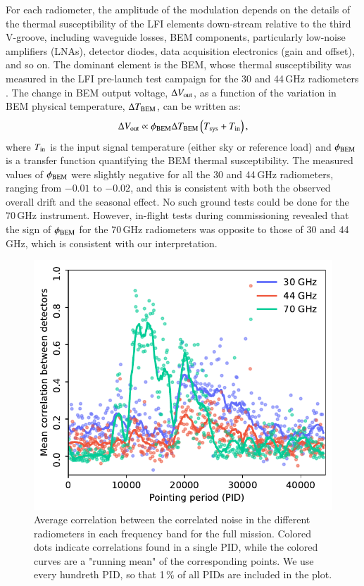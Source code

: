 \documentclass{aa}
\begin{document}
For each radiometer, the amplitude of the modulation depends on the
details of the thermal susceptibility of the LFI elements down-stream
relative to the third V-groove, including waveguide losses, BEM
components, particularly low-noise amplifiers (LNAs), detector diodes,
data acquisition electronics (gain and offset), and so on.
The dominant element is the BEM, whose
thermal susceptibility was measured in the LFI pre-launch test
campaign for the 30 and 44\,GHz radiometers \citep{villa2010}. The
change in BEM output voltage, $\Delta V_{\rm out}$, as a function of
the variation in BEM physical temperature, $\Delta T_{\rm BEM}$, can
be written as:
\begin{equation}
\Delta V_{\rm out} \propto \phi_{\rm BEM} \Delta T_{\rm BEM}
\left(T_{\rm sys} + T_{\rm in} \right),
\end{equation}
where $T_{\rm in}$ is the input signal temperature (either sky or
reference load) and $\phi_{\rm BEM}$ is a transfer function
quantifying the BEM thermal susceptibility. The measured values of
$\phi_{\rm BEM}$ \citep{villa2010} were slightly negative for all the
30 and 44\,GHz radiometers, ranging from $-0.01$ to $-0.02$, and this
is consistent with both the observed overall drift and the seasonal
effect. No such ground tests could be done for the 70\,GHz instrument.
However, in-flight tests during commissioning \citep{Cuttaia2011}
revealed that the sign of $\phi_{\rm BEM}$ for the 70\,GHz radiometers
was opposite to those of 30 and 44\,GHz, which is consistent with our
interpretation.
\begin{figure}
        \begin{center}
                \includegraphics[width=\linewidth]{figs/mean_corr_vs_pid_final.pdf}
        \end{center}
        \caption{Average correlation between the correlated noise in the different radiometers 
                in each frequency band for the full mission. Colored dots indicate correlations found 
                in a single PID, while the colored curves are a "running mean" of the corresponding 
                points. We use every hundreth PID, so that 1\,\% of all PIDs are included in the plot. 
                \label{fig:corr_v_pid}}
\end{figure}
\end{document}
